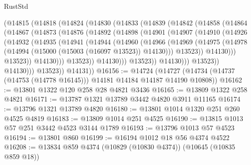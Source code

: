 \begin{lexlean}{RustStd}
\begin{coremodule}
          (@14815
            (@14818
              (@14824
                (@14830
                  (@14833
                    (@14839
                      (@14842
                        (@14858
                          (@14864
                            (@14867
                              (@14873
                                (@14876
                                  (@14892
                                    (@14898
                                      (@14901
                                        (@14907
                                          (@14910
                                            (@14926
                                              (@14932
                                                (@14935
                                                  (@14941
                                                    (@14944
                                                      (@14960
                                                        (@14966
                                                          (@14969
                                                            (@14975
                                                              (@14978
                                                                (@14994
                                                                  (@15000
                                                                    (@15003 (@16097 @13523))
                                                                    @14130)))
                                                              @13523))
                                                          @14130)))
                                                    @13523))
                                                @14130)))
                                          @13523))
                                      @14130)))
                                @13523))
                            @14130)))
                      @13523))
                  @14130)))
            @13523))
        @14131))
@16156 := @14724
    (@14727 (@14734 (@14737 (@14753 (@14778 @16145))) @14181 @14184 @14187 @14190 @10808))
@16162 := @13801 @1322 @120 @258 @28 @4821 @3436
@16165 := @13809 @1322 @258 @4821
@16171 := @13787 @1321 @13789 @3442 @4820 @3911 @11165
@16174 := @13796 @1321 @13789 @4820
@16180 := @13801 @1014 @1320 @251 @260 @4525 @4819
@16183 := @13809 @1014 @251 @4525
@16190 := @13815 @1013 @57 @251 @3442 @4523 @3144 @1789
@16193 := @13796 @1013 @57 @4523
@16194 := @13801 @860
@16199 := @16194 @1012 @18 @56 @4374 @4522
@16208 := @13834 @859 @4374 (@10829 (@10830 @4374)) (@10645 (@10835 @859 @18))

\end{coremodule}
\end{lexlean}
